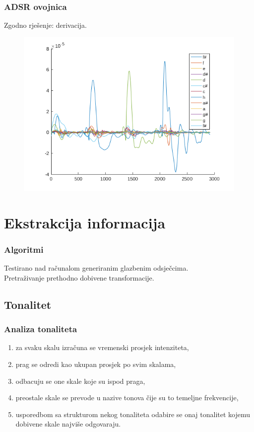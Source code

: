\documentclass[11pt]{beamer}
\begin{document}
  \begin{frame}
    \frametitle{ADSR ovojnica}
    Zgodno rješenje: derivacija.
    \begin{figure}
      \centering
      \includegraphics[height=0.8\textheight]{adsr_der.png}
    \end{figure}
  \end{frame}

  \section{Ekstrakcija informacija}
  \begin{frame}
    \frametitle{Algoritmi}
    Testirano nad računalom generiranim glazbenim odsječcima.\\
    \vspace{10pt}
    Pretraživanje prethodno dobivene transformacije.
  \end{frame}
  
  \subsection{Tonalitet}
  \begin{frame}
    \frametitle{Analiza tonaliteta}
    \begin{enumerate}
      \item za svaku skalu izračuna se vremenski prosjek intenziteta,
      \item prag se odredi kao ukupan prosjek po svim skalama,
      \item odbacuju se one skale koje su ispod praga,
      \item preostale skale se prevode u nazive tonova čije su to temeljne frekvencije,
      \item usporedbom sa strukturom nekog tonaliteta odabire se onaj tonalitet kojemu dobivene skale najviše odgovaraju.
    \end{enumerate}
  \end{frame}
\end{document}

